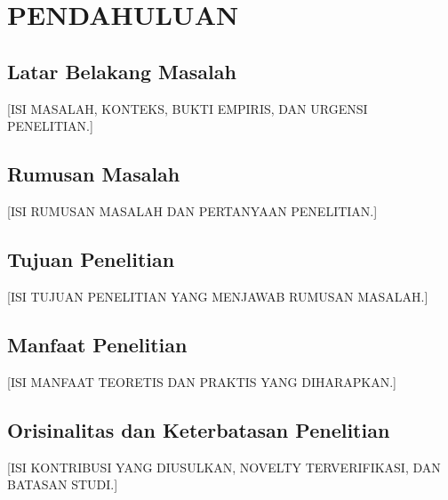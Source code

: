 \chapter[PENDAHULUAN]{\\ PENDAHULUAN}
\section{Latar Belakang Masalah}
[ISI MASALAH, KONTEKS, BUKTI EMPIRIS, DAN URGENSI PENELITIAN.]

\section{Rumusan Masalah}
[ISI RUMUSAN MASALAH DAN PERTANYAAN PENELITIAN.]

\section{Tujuan Penelitian}
[ISI TUJUAN PENELITIAN YANG MENJAWAB RUMUSAN MASALAH.]

\section{Manfaat Penelitian}
[ISI MANFAAT TEORETIS DAN PRAKTIS YANG DIHARAPKAN.]

\section{Orisinalitas dan Keterbatasan Penelitian}
[ISI KONTRIBUSI YANG DIUSULKAN, NOVELTY TERVERIFIKASI, DAN BATASAN STUDI.]
